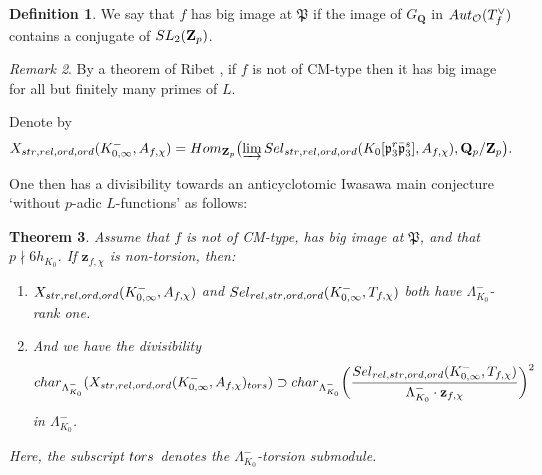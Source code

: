\documentclass[10pt,letterpaper]{amsart}
\theoremstyle{plain}
\newtheorem{thm}{Theorem}[subsection] %
\theoremstyle{definition}
\newtheorem{defn}[thm]{Definition}
\theoremstyle{definition}
\theoremstyle{plain}
\theoremstyle{plain}
\theoremstyle{plain}
\theoremstyle{remark}
\newtheorem{rem}[thm]{Remark}
\numberwithin{equation}{section}
\newcommand{\relstr}{{{\rm rel},{\rm str}}}
\newcommand{\strrel}{{{\rm str},{\rm rel}}}
\newcommand{\ord}{{{\rm ord},{\rm ord}}}
\def\cO{\mathcal O}
\newcommand{\Q}{\mathbf{Q}}
\newcommand{\Z}{\mathbf{Z}}
\begin{document}
\begin{defn}\label{notation-bigimage}We say that $f$ {has big image at $\mathfrak{P}$} if the image of $G_\Q$ in ${\rm Aut}_{\cO}(T_f^\vee)$ contains a conjugate of ${\rm SL}_2(\Z_p)$.
\end{defn}

\begin{rem}By a theorem of Ribet \cite{Ribet-glasgow}, if $f$ is not of CM-type then it has big image for all but finitely many primes of $L$.
\end{rem}

Denote by 
\[
X_{\strrel,\ord}(K_{0,\infty}^-,A_{f,\chi})={\rm Hom}_{\Z_p}\bigl(\varinjlim{\rm Sel}_{\strrel,\ord}(K_0[\mathfrak{p}_3^r\bar{\mathfrak{p}}_3^s],A_{f,\chi}),\Q_p/\Z_p\bigr).
\]


One then has a divisibility towards an anticyclotomic Iwasawa main conjecture `without $p$-adic $L$-functions' as follows:
\begin{thm}\label{thm:IMC-general}
Assume that $f$ is not of CM-type, has big image at $\mathfrak{P}$, and that $p\nmid 6h_{K_0}$. 
If $\mathbf{z}_{f,\chi}$ is non-torsion, then: 
\begin{enumerate}
    \item $X_{\strrel,\ord}(K_{0,\infty}^-,A_{f,\chi})$ and ${\rm Sel}_{\relstr,\ord}(K_{0,\infty}^-,T_{f,\chi})$ both have $\Lambda_{K_0}^-$-rank one.
\item And we have the divisibility
\[
{\rm char}_{\Lambda_{K_0}^-}(X_{\strrel,\ord}(K_{0,\infty}^-,A_{f,\chi})_{\rm tors})\supset{\rm char}_{\Lambda_{K_0}^-}\biggl(\frac{{\rm Sel}_{\relstr,\ord}(K_{0,\infty}^-,T_{f,\chi})}{\Lambda_{K_0}^-\cdot\mathbf{z}_{f,\chi}}\biggr)^2
\]
in $\Lambda_{K_0}^-$. 
\end{enumerate}
Here, the subscript ${\rm tors}$ denotes the $\Lambda_{K_0}^-$-torsion submodule.
\end{thm}
\end{document}
